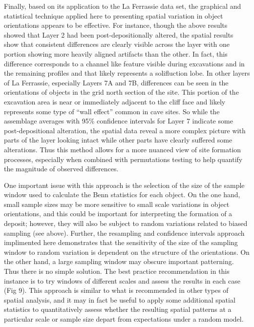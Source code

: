 \documentclass[]{article}
\begin{document}
Finally, based on its application to the La Ferrassie data set, the
graphical and statistical technique applied here to presenting spatial
variation in object orientations appears to be effective. For instance,
though the above results showed that Layer 2 had been
post-depositionally altered, the spatial results show that consistent
differences are clearly visible across the layer with one portion
showing more heavily aligned artifacts than the other. In fact, this
difference corresponds to a channel like feature visible during
excavations and in the remaining profiles and that likely represents a
solifluction lobe. In other layers of La Ferrassie, especially Layers 7A
and 7B, differences can be seen in the orientations of objects in the
grid north section of the site. This portion of the excavation area is
near or immediately adjacent to the cliff face and likely represents
some type of ``wall effect'' common in cave sites. So while the
assemblage averages with 95\% confidence intervals for Layer 7 indicate
some post-depositional alteration, the spatial data reveal a more
complex picture with parts of the layer looking intact while other parts
have clearly suffered some alterations. Thus this method allows for a
more nuanced view of site formation processes, especially when combined
with permutations testing to help quantify the magnitude of observed
differences.

One important issue with this approach is the selection of the size of
the sample window used to calculate the Benn statistics for each object.
On the one hand, small sample sizes may be more sensitive to small scale
variations in object orientations, and this could be important for
interpreting the formation of a deposit; however, they will also be
subject to random variations related to biased sampling (see above).
Further, the resampling and confidence intervals approach implimented
here demonstrates that the sensitivity of the size of the sampling
window to random variation is dependent on the structure of the
orientations. On the other hand, a large sampling window may obscure
important patterning. Thus there is no simple solution. The best
practice recommendation in this instance is to try windows of different
scales and assess the results in each case (Fig 9). This approach is
similar to what is recommended in other types of spatial analysis, and
it may in fact be useful to apply some additional spatial statistics to
quantitatively assess whether the resulting spatial patterns at a
particular scale or sample size depart from expectations under a random
model.
\end{document}
